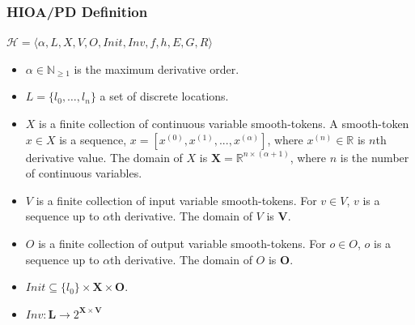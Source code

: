 \begin{frame}[c] \frametitle{ HIOA/PD Definition }
	\vspace{-5pt}
	\begin{block}{}
		$\mathcal{H} = \langle \alpha, L, X, V, O, Init, Inv, f, h, E, G, R\rangle $
		\begin{itemize}
		\item $\alpha \in \mathbb{N}_{\geq 1}$ is the maximum derivative order.
		\item $L = \{l_{0},\ldots,l_{n}\}$ a set of discrete locations.
		\item $X$ is a finite collection of continuous variable smooth-tokens. A smooth-token $x \in X$ is a sequence, $x = [ x^{(0)}, x^{(1)}, ..., x^{(\alpha)} ] $, where $x^{(n)} \in \mathbb{R}$ is $n$th derivative value. The domain of $X$ is $\mathbf{X} = \mathbb{R}^{n \times (\alpha + 1)}$, where $n$ is the number of continuous variables.
		\item $V$ is a finite collection of input variable smooth-tokens. For $v \in V$, $v$ is a sequence up to $\alpha$th derivative. The domain of $V$ is $\mathbf{V}$.
		\item $O$ is a finite collection of output variable smooth-tokens. For $o \in O$, $o$ is a sequence up to $\alpha$th derivative. The domain of $O$ is $\mathbf{O}$.
		\item $Init \subseteq \{l_0\} \times \mathbf{X} \times \mathbf{O}$.
		\item $Inv: \mathbf{L} \rightarrow 2^{\mathbf{X} \times \mathbf{V} }$
		\end{itemize}
	\end{block}
\end{frame}

